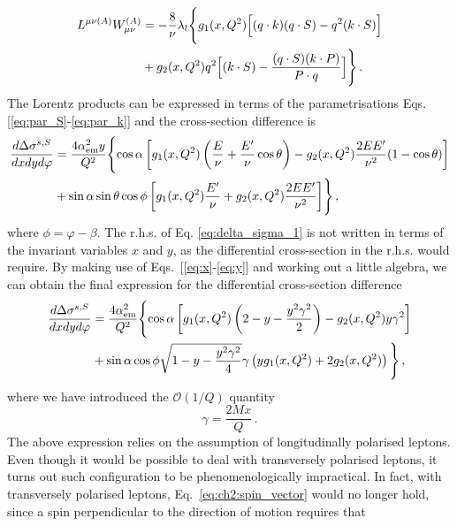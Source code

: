 \begin{equation}
  \begin{split}
    L^{\mu \nu (A)} W_{\mu \nu}^{(A)} & = - \frac{8}{\nu} \lambda_{l} \Biggl\{ g_1(x,Q^2) \Bigl[ (q \cdot k)(q \cdot S) - q^2 (k \cdot S) \Bigr] \Biggr. \\
    & +  \Biggl. g_2 (x, Q^2) q^2\Bigl[ (k \cdot S) - \frac{(q \cdot S) (k \cdot P)}{P \cdot q} \Bigr] \Biggr\}\,.
  \end{split}
\end{equation}
The Lorentz products can be expressed in terms of the parametrisations Eqs. [\ref{eq:par_S}-\ref{eq:par_k}] and the cross-section difference is
\begin{equation}
  \begin{split}
    \frac{d \Delta \sigma^{s,S}}{dx dy d\varphi} & = \frac{4 \alpha_{\textrm{em}}^2 y}{Q^2} \Biggl\{ \cos \alpha \left[ g_1(x,Q^2) \left( \frac{E}{\nu} + \frac{E'}{\nu} \cos \theta \right) - g_2(x,Q^2) \frac{2 E E'}{\nu^2} (1 - \cos \theta) \right] \Biggr. \\
    & + \Biggl. \sin\alpha \sin\theta \cos\phi \left[ g_1(x,Q^2) \frac{E'}{\nu} + g_2(x,Q^2) \frac{2EE'}{\nu^2} \right] \Biggr\}\,,
  \end{split}
  \label{eq:delta_sigma_1}
\end{equation}
where $\phi = \varphi - \beta$.
The r.h.s. of Eq. \eqref{eq:delta_sigma_1} is not written in terms of the invariant variables $x$ and $y$, as the differential cross-section in the r.h.s. would require. By making use of Eqs.~[\ref{eq:x}-\ref{eq:y}] and working out a little algebra, we can obtain the final expression for the differential cross-section difference
\begin{equation}
  \begin{split}
    \frac{d \Delta \sigma^{s,S}}{dx dy d\varphi} & = \frac{4 \alpha_{\textrm{em}}^2}{Q^2} \Biggl\{ \cos \alpha \left[ g_1(x,Q^2) \left( 2 - y - \frac{y^2 \gamma^2}{2} \right) - g_2(x,Q^2) y \gamma^2 \right] \Biggr.\\
    & + \sin \alpha \cos \phi \sqrt{1 - y - \frac{y^2 \gamma^2}{4}} \gamma \left( y g_1(x,Q^2) + 2 g_2(x,Q^2) \right) \Biggl. \Biggr\}\,,
  \end{split}
  \label{eq:cs_diff_fin_S}
\end{equation}
where we have introduced the $\mathcal{O}(1/Q)$ quantity 
\begin{equation}
  \gamma = \frac{2Mx}{Q} \,.
  \label{eq:gamma}
\end{equation}
The above expression relies on the assumption of longitudinally polarised leptons. Even though it would be possible to deal with transversely polarised leptons, it turns out such configuration to be phenomenologically impractical. In fact, with transversely polarised leptons, Eq.~\eqref{eq:ch2:spin_vector} would no longer hold, since a spin perpendicular to the direction of motion requires that
